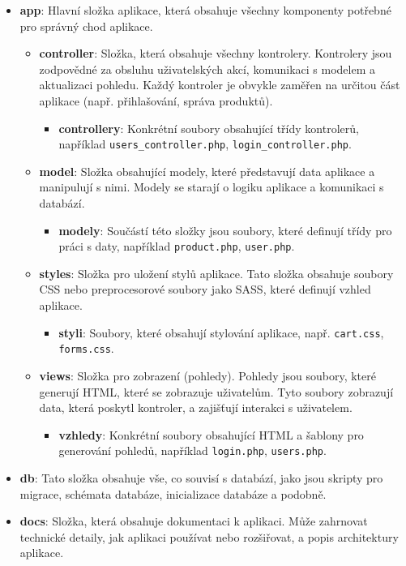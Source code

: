 \documentclass[12pt, a4paper]{report}
\begin{document}
\begin{itemize}
  \item \textbf{app}: Hlavní složka aplikace, která obsahuje všechny komponenty potřebné pro správný chod aplikace.
  \begin{itemize}
    \item \textbf{controller}: Složka, která obsahuje všechny kontrolery. Kontrolery jsou zodpovědné za obsluhu uživatelských akcí, komunikaci s modelem a aktualizaci pohledu. Každý kontroler je obvykle zaměřen na určitou část aplikace (např. přihlašování, správa produktů).
    \begin{itemize}
        \item \textbf{controllery}: Konkrétní soubory obsahující třídy kontrolerů, například \texttt{users\_controller.php}, \texttt{login\_controller.php}.
    \end{itemize}
    
    \item \textbf{model}: Složka obsahující modely, které představují data aplikace a manipulují s nimi. Modely se starají o logiku aplikace a komunikaci s databází.
    \begin{itemize}
      \item \textbf{modely}: Součástí této složky jsou soubory, které definují třídy pro práci s daty, například \texttt{product.php}, \texttt{user.php}.
    \end{itemize}
    
    \item \textbf{styles}: Složka pro uložení stylů aplikace. Tato složka obsahuje soubory CSS nebo preprocesorové soubory jako SASS, které definují vzhled aplikace.
    \begin{itemize}
      \item \textbf{styli}: Soubory, které obsahují stylování aplikace, např. \texttt{cart.css}, \texttt{forms.css}.
    \end{itemize}
    
    \item \textbf{views}: Složka pro zobrazení (pohledy). Pohledy jsou soubory, které generují HTML, které se zobrazuje uživatelům. Tyto soubory zobrazují data, která poskytl kontroler, a zajišťují interakci s uživatelem.
    \begin{itemize}
      \item \textbf{vzhledy}: Konkrétní soubory obsahující HTML a šablony pro generování pohledů, například \texttt{login.php}, \texttt{users.php}.
    \end{itemize}
  \end{itemize}
  
  \item \textbf{db}: Tato složka obsahuje vše, co souvisí s databází, jako jsou skripty pro migrace, schémata databáze, inicializace databáze a podobně.
  
  \item \textbf{docs}: Složka, která obsahuje dokumentaci k aplikaci. Může zahrnovat technické detaily, jak aplikaci používat nebo rozšiřovat, a popis architektury aplikace.
\end{itemize}
\end{document}
